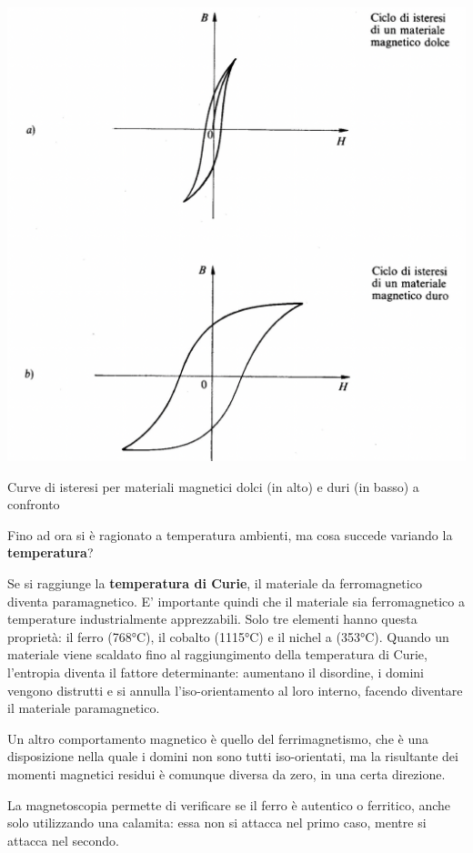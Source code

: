 \begin{marginfigure}[-9cm]
\includegraphics{images/img22.png}
\caption{Curve di isteresi per materiali magnetici dolci (in alto) e duri (in basso) a confronto}
\end{marginfigure}

Fino ad ora si è ragionato a temperatura ambienti, ma cosa succede variando la \textbf{temperatura}?

 Se si raggiunge la \textbf{temperatura di Curie}, il materiale da ferromagnetico diventa paramagnetico.
E’ importante quindi che il materiale sia ferromagnetico a temperature industrialmente apprezzabili. Solo tre elementi hanno questa proprietà: il ferro (768°C), il cobalto (1115°C) e il nichel a (353°C). Quando un materiale viene scaldato fino al raggiungimento della temperatura di Curie, l’entropia diventa il fattore determinante: aumentano il disordine, i domini vengono distrutti e si annulla l’iso-orientamento al loro interno, facendo diventare il materiale paramagnetico.

Un altro comportamento magnetico è quello del ferrimagnetismo, che è una disposizione nella quale i domini non sono tutti iso-orientati, ma la risultante dei momenti magnetici residui è comunque diversa da zero, in una certa direzione.

La magnetoscopia permette di verificare se il ferro è autentico o ferritico, anche solo utilizzando una calamita: essa non si attacca nel primo caso, mentre si attacca nel secondo.